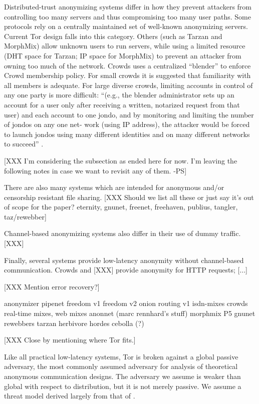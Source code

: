 \documentclass[times,10pt,twocolumn]{article}
\begin{document}
Distributed-trust anonymizing systems differ in how they prevent attackers
from controlling too many servers and thus compromising too many user paths.
Some protocols rely on a centrally maintained set of well-known anonymizing
servers.  Current Tor design falls into this category.
Others (such as Tarzan and MorphMix) allow unknown users to run
servers, while using a limited resource (DHT space for Tarzan; IP space for
MorphMix) to prevent an attacker from owning too much of the network.
Crowds uses a centralized ``blender'' to enforce Crowd membership
policy. For small crowds it is suggested that familiarity with all
members is adequate. For large diverse crowds, limiting accounts in
control of any one party is more difficult: 
``(e.g., the blender administrator sets up an account for a user only
after receiving a written, notarized request from that user) and each
account to one jondo, and by monitoring and limiting the number of
jondos on any one net- work (using IP address), the attacker would be
forced to launch jondos using many different identities and on many
different networks to succeed'' \cite{crowds-tissec}.


[XXX I'm considering the subsection as ended here for now. I'm leaving the
following notes in case we want to revisit any of them. -PS]

There are also many systems which are intended for anonymous
and/or censorship resistant file sharing. [XXX Should we list all these
or just say it's out of scope for the paper?
eternity, gnunet, freenet, freehaven, publius, tangler, taz/rewebber]



Channel-based anonymizing systems also differ in their use of dummy traffic.
[XXX]

Finally, several systems provide low-latency anonymity without channel-based
communication.  Crowds and [XXX] provide anonymity for HTTP requests; [...]

[XXX Mention error recovery?]



anonymizer%
pipenet%
freedom v1%
freedom v2%
onion routing v1%
isdn-mixes%
crowds%
real-time mixes, web mixes%
anonnet (marc rennhard's stuff)%
morphmix%
P5%
gnunet%
rewebbers%
tarzan%
herbivore%
hordes%
cebolla (?)%

[XXX Close by mentioning where Tor fits.]

\label{subsec:threat-model}

Like all practical low-latency systems, Tor is broken against a global
passive adversary, the most commonly assumed adversary for analysis of
theoretical anonymous communication designs. The adversary we assume
is weaker than global with respect to distribution, but it is not
merely passive. We assume a threat model derived largely from that of
\cite{or-pet00}.
\end{document}
